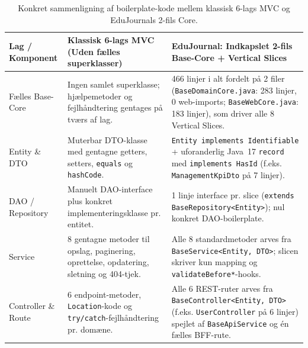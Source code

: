 \documentclass[11pt,a4paper]{article}
\begin{document}
\begin{table}[H]
\centering
\small
\begin{tabularx}{\textwidth}{P{3.0cm} P{4.8cm} Y}
\toprule
\textbf{Lag / Komponent} & \textbf{Klassisk 6-lags MVC (Uden fælles superklasser)} & \textbf{EduJournal: Indkapslet 2-fils Base-Core + Vertical Slices} \\
\midrule
Fælles Base-Core & Ingen samlet superklasse; hjælpemetoder og fejlhåndtering gentages på tværs af lag. & 466 linjer i alt fordelt på 2 filer (\texttt{BaseDomainCore.java}: 283 linjer, 0 web-imports; \texttt{BaseWebCore.java}: 183 linjer), som driver alle 8 Vertical Slices. \\
\midrule
Entity \& DTO & Muterbar DTO-klasse med gentagne getters, setters, \texttt{equals} og \texttt{hashCode}. & \texttt{Entity implements Identifiable} + uforanderlig Java~17 \texttt{record} med \texttt{implements HasId} (f.eks. \texttt{ManagementKpiDto} på 7 linjer). \\
\midrule
DAO / Repository & Manuelt DAO-interface plus konkret implementeringsklasse pr. entitet. & 1 linje interface pr. slice (\texttt{extends BaseRepository<Entity>}); nul konkret DAO-boilerplate. \\
\midrule
Service & 8 gentagne metoder til opslag, paginering, oprettelse, opdatering, sletning og 404-tjek. & Alle 8 standardmetoder arves fra \texttt{BaseService<Entity, DTO>}; slicen skriver kun mapping og \texttt{validateBefore*}-hooks. \\
\midrule
Controller \& Route & 6 endpoint-metoder, \texttt{Location}-kode og \texttt{try/catch}-fejlhåndtering pr. domæne. & Alle 6 REST-ruter arves fra \texttt{BaseController<Entity, DTO>} (f.eks. \texttt{UserController} på 6 linjer) spejlet af \texttt{BaseApiService} og én fælles BFF-rute. \\
\bottomrule
\end{tabularx}
\caption{Konkret sammenligning af boilerplate-kode mellem klassisk 6-lags MVC og EduJournals 2-fils Core.}
\label{tab:boilerplate_comparison}
\end{table}
\end{document}

